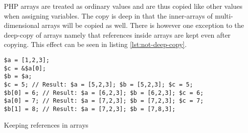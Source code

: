 PHP arrays are treated as ordinary values and are thus copied like other values when assigning variables. The copy is deep in that the inner-arrays of multi-dimensional arrays will be copied as well. There is however one exception to the deep-copy of arrays namely that references inside arrays are kept even after copying. This effect can be seen in listing \ref{lst:not-deep-copy}.

\begin{program}
\begin{lstlisting}
$a = [1,2,3];
$c = &$a[0];
$b = $a;
$c = 5; // Result: $a = [5,2,3]; $b = [5,2,3]; $c = 5;
$b[0] = 6; // Result: $a = [6,2,3]; $b = [6,2,3]; $c = 6;
$a[0] = 7; // Result: $a = [7,2,3]; $b = [7,2,3]; $c = 7;
$b[1] = 8; // Result: $a = [7,2,3]; $b = [7,8,3];
\end{lstlisting}
\caption{Keeping references in arrays}
\label{lst:not-deep-copy}
\end{program}